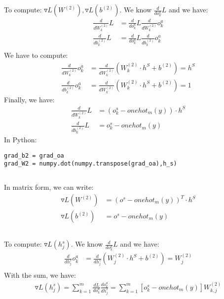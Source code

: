 \documentclass[12pt]{article}
\begin{document}
\subsection{}
To compute: $\triangledown L(W^{(2)}), \triangledown L(b^{(2)})$.
We know $\frac{d}{do^a_k} L$ and we have:
\begin{align*}
\frac{d}{dW^{(2)}_{k}} L &= \frac{d}{do^a_k} L \frac{d}{dW^{(2)}_{k}} o^a_k \\
\frac{d}{db^{(2)}_{k}} L &= \frac{d}{do^a_k} L \frac{d}{db^{(2)}_{k}} o^a_k \\
\end{align*}
We have to compute:
\begin{align*}
\frac{d}{dW^{(2)}_{k}} o^a_k & = \frac{d}{dW^{(2)}_{k}} (W^{(2)}_{k} \cdot h^S + b^{(2)}) = h^S \\
\frac{d}{db^{(2)}_{k}} o^a_k &= \frac{d}{dW^{(2)}_{k}} (W^{(2)}_{k} \cdot h^S + b^{(2)}) = 1
\end{align*}
Finally, we have:
\begin{align*}
\frac{d}{dW^{(2)}_{k}} L & = (o^s_k-onehot_m(y)) \cdot h^S \\
\frac{d}{db^{(2)}_{k}} L & = o^s_k-onehot_m(y)
\end{align*}
In Python:
\begin{lstlisting}
grad_b2 = grad_oa
grad_W2 = numpy.dot(numpy.transpose(grad_oa),h_s)
\end{lstlisting}
\subsection{}
In matrix form, we can write:
\begin{align*}
\triangledown L(W^{(2)}) & = (o^s-onehot_m(y))^T \cdot h^S \\
\triangledown L(b^{(2)}) & = o^s-onehot_m(y)
\end{align*}
\subsection{}
To compute: $\triangledown L(h^s_j)$.
We know $\frac{d}{do^a_k} L$ and we have:
\begin{align*}
\frac{d}{dh^s_j} {o^a_k} &= \frac{d}{dh^s_j} (W^{(2)}_{j} \cdot h^S + b^{(2)}) = W^{(2)}_{j} \\
\end{align*}
With the sum, we have:
\begin{align*}
\triangledown L(h^s_j) = \sum\limits_{k=1}^m \frac{dL}{do^a_k} \frac{d{o^a_k}}{dh^s_j} = 
\sum\limits_{k=1}^m [o^s_k - onehot_m(y)]  W^{(2)}_{k,j}
\end{align*}
\end{document}
